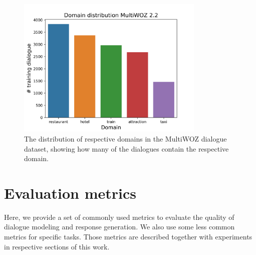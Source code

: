 \begin{figure}[ht]
    \centering
    \includegraphics[width=0.8\textwidth]{images/multiwoz-distribution.png}
    \caption{The distribution of respective domains in the MultiWOZ dialogue dataset, showing how many of the dialogues contain the respective domain.}
    \label{02:fig:mw-dist}
\end{figure}


\section{Evaluation metrics}
\label
{02:sec:eval_metrics}
Here, we provide a set of commonly used metrics to evaluate the quality of dialogue modeling and response generation.
We also use some less common metrics for specific tasks.
Those metrics are described together with experiments in respective sections of this work.
